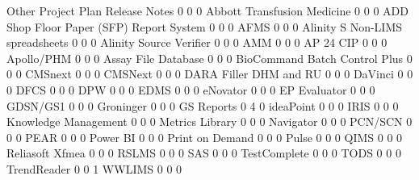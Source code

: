 \documentclass{article}
\begin{document}
\begin{Schunk}
\begin{Soutput}
                                           Other Project Plan Release Notes
                                               0            0             0
  Abbott Transfusion Medicine                  0            0             0
  ADD Shop Floor Paper (SFP) Report System     0            0             0
  AFMS                                         0            0             0
  Alinity S Non-LIMS spreadsheets              0            0             0
  Alinity Source Verifier                      0            0             0
  AMM                                          0            0             0
  AP 24 CIP                                    0            0             0
  Apollo/PHM                                   0            0             0
  Assay File Database                          0            0             0
  BioCommand Batch Control Plus                0            0             0
  CMSnext                                      0            0             0
  CMSNext                                      0            0             0
  DARA Filler DHM and RU                       0            0             0
  DaVinci                                      0            0             0
  DFCS                                         0            0             0
  DPW                                          0            0             0
  EDMS                                         0            0             0
  eNovator                                     0            0             0
  EP Evaluator                                 0            0             0
  GDSN/GS1                                     0            0             0
  Groninger                                    0            0             0
  GS Reports                                   0            4             0
  ideaPoint                                    0            0             0
  IRIS                                         0            0             0
  Knowledge Management                         0            0             0
  Metrics Library                              0            0             0
  Navigator                                    0            0             0
  PCN/SCN                                      0            0             0
  PEAR                                         0            0             0
  Power BI                                     0            0             0
  Print on Demand                              0            0             0
  Pulse                                        0            0             0
  QIMS                                         0            0             0
  Reliasoft Xfmea                              0            0             0
  RSLMS                                        0            0             0
  SAS                                          0            0             0
  TestComplete                                 0            0             0
  TODS                                         0            0             0
  TrendReader                                  0            0             1
  WWLIMS                                       0            0             0
                                          

\end{Soutput}
\end{Schunk}
\end{document}
